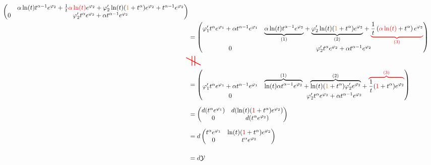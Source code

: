 \begin{align*}
\begin{pmatrix}
    &
    \alpha\ln(t)t^{\alpha-1} e^{\phi_2}
    +\frac{1}{t}\textcolor{red}{\alpha\ln(t)}e^{\phi_2}
    +\phi_2' \ln(t)(\textcolor{brown}{1}+t^\alpha)e^{\phi_2}
    +t^{\alpha-1} e^{\phi_2}
    \\0 & \phi_2' t^\alpha e^{\phi_2}+\alpha t^{\alpha-1} e^{\phi_2}
  \end{pmatrix}
  \\&=\begin{pmatrix}
    \phi_1' t^\alpha e^{\phi_1} +\alpha t^{\alpha-1} e^{\phi_1}
    &
    \underset{(1)}{\underbrace{\alpha\ln(t)t^{\alpha-1} e^{\phi_2}}}
    +\underset{(2)}{\underbrace{%
      \phi_2' \ln(t)(\textcolor{brown}{1}+t^\alpha)e^{\phi_2}}}
    +\textcolor{red}{\underset{(3)}{\underbrace{\textcolor{black}{%
      \frac{1}{t}\left(\textcolor{red}{\alpha\ln(t)}
        +t^\alpha\right) e^{\phi_2}
    }}}}
    \\0 & \phi_2' t^\alpha e^{\phi_2}+\alpha t^{\alpha-1} e^{\phi_2}
  \end{pmatrix}
  \\&\!\!\text{\textcolor{red}{\Huge\rotatebox[origin=c]{-90}{$\neq$}}}
  \\&=\begin{pmatrix}
    \phi_1' t^\alpha e^{\phi_1} +\alpha t^{\alpha-1} e^{\phi_1} 
    &
    \overset{(1)}{\overbrace{\ln(t)\alpha t^{\alpha-1}e^{\phi_2}}}
    +\overset{(2)}{\overbrace{%
      \ln(t)(\textcolor{brown}{1}+t^\alpha)\phi_2'e^{\phi_2}}}
    +\textcolor{red}{\overset{(3)}{\overbrace{\textcolor{black}{%
      \frac{1}{t}(\textcolor{red}{1}+t^\alpha)e^{\phi_2}
    }}}}
    \\0 & \phi_2' t^\alpha e^{\phi_2}+\alpha t^{\alpha-1} e^{\phi_2}
  \end{pmatrix}
  \\&=\begin{pmatrix}
    d(t^\alpha e^{\phi_1}) & d(\ln(t)(\textcolor{red}{1}+t^\alpha)e^{\phi_2})
    \\0 & d(t^\alpha e^{\phi_2})
  \end{pmatrix}
  \\&=d\begin{pmatrix}
    t^\alpha e^{\phi_1} & \ln(t)(\textcolor{red}{1}+t^\alpha)e^{\phi_2}
    \\0 & t^\alpha e^{\phi_2}
  \end{pmatrix}
  \\&=d\cY
\end{align*}
